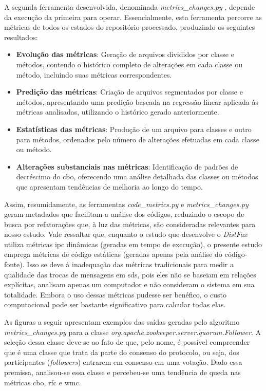 A segunda ferramenta desenvolvida, denominada \textit{metrics\_changes.py} \cite{PyDriller:MetricsChanges:2023},  depende da execução da primeira para operar. Essencialmente, esta ferramenta percorre as métricas de todos os estados do repositório processado, produzindo os seguintes resultados:

\begin{itemize}
    \item \textbf{Evolução das métricas}: Geração de arquivos divididos por classe e métodos, contendo o histórico completo de alterações em cada classe ou método, incluindo suas métricas correspondentes.
    \item \textbf{Predição das métricas}: Criação de arquivos segmentados por classe e métodos, apresentando uma predição baseada na regressão linear aplicada às métricas analisadas, utilizando o histórico gerado anteriormente.
    \item \textbf{Estatísticas das métricas}: Produção de um arquivo para classes e outro para métodos, ordenados pelo número de alterações efetuadas em cada classe ou método.
    \item \textbf{Alterações substanciais nas métricas}: Identificação de padrões de decréscimo do \gls{cbo}, oferecendo uma análise detalhada das classes ou métodos que apresentam tendências de melhoria ao longo do tempo.
\end{itemize}

Assim, resumidamente, as ferramentas \textit{code\_metrics.py} e \textit{metrics\_changes.py} geram metadados que facilitam a análise dos códigos, reduzindo o escopo de busca por refatorações que, à luz das métricas, são consideradas relevantes para nosso estudo. Vale ressaltar que, enquanto o estudo que desenvolve o \textit{DistFax} \cite{DistFax} utiliza métricas \gls{ipc} dinâmicas (geradas em tempo de execução), o presente estudo emprega métricas de código estáticas (geradas apenas pela análise do código-fonte). Isso se deve à inadequação das métricas tradicionais para medir a qualidade das trocas de mensagens em \gls{sds}, pois eles não se baseiam em relações explícitas, analisam apenas um computador e não consideram o sistema em sua totalidade. Embora o uso dessas métricas pudesse ser benéfico, o custo computacional pode ser bastante significativo para calcular todas elas.

As figuras a seguir apresentam exemplos das saídas geradas pelo algoritmo \textit{metrics\_changes.py} para a classe \textit{org.apache.zookeeper.server.quorum.Follower}. A seleção dessa classe deve-se ao fato de que, pelo nome, é possível compreender que é uma classe que trata da parte do consenso do protocolo, ou seja, dos participantes (\textit{followers}) entrarem em consenso em uma votação. Dado essa premissa, analisou-se essa classe e percebeu-se uma tendência de queda nas métricas \gls{cbo}, \gls{rfc} e \gls{wmc}.

